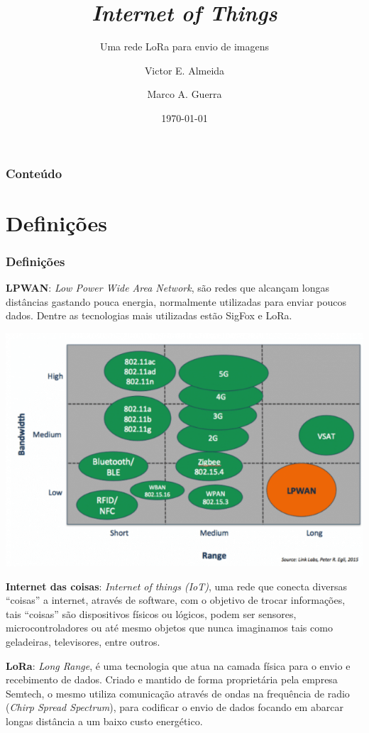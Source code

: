\documentclass[12pt]{beamer}
\author{Victor E. Almeida \and Marco A. Guerra}
\title{\textit{Internet of Things}}
\subtitle{Uma rede LoRa para envio de imagens}
\date{\today}
\institute{UNIOESTE}
\begin{document}
\frame{\titlepage}

\begin{frame}
\frametitle{Conteúdo}
\tableofcontents
\end{frame}

\section{Definições}
\begin{frame}[allowframebreaks]
    \frametitle{Definições}

    \textbf{LPWAN}: \textit{Low Power Wide Area Network}, são redes que alcançam longas distâncias gastando pouca energia, normalmente utilizadas para enviar poucos dados. Dentre as tecnologias mais utilizadas estão SigFox e LoRa.

    \framebreak

    \includegraphics[width=.9\textwidth]{Comparativo-algumas-redes}

    \framebreak

    \textbf{Internet das coisas}: \textit{Internet of things (IoT)}, uma rede que conecta diversas ``coisas'' a internet, através de software, com o objetivo de trocar informações, tais ``coisas'' são dispositivos físicos ou lógicos, podem ser sensores, microcontroladores ou até mesmo objetos que nunca imaginamos tais como geladeiras, televisores, entre outros.

    \framebreak

    \textbf{LoRa}: \textit{Long Range}, é uma tecnologia que atua na camada física para o envio e recebimento de dados. Criado e mantido de forma proprietária pela empresa Semtech, o mesmo utiliza comunicação através de ondas na frequência de radio (\textit{Chirp Spread Spectrum}), para codificar o envio de dados focando em abarcar longas distância a um baixo custo energético.
\end{frame}
\end{document}
